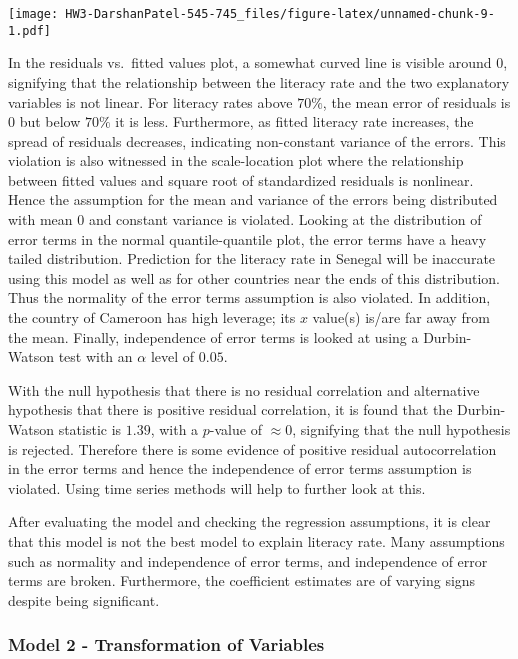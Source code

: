 \documentclass[]{article}
\begin{document}
\texttt{[image: HW3-DarshanPatel-545-745\_files/figure-latex/unnamed-chunk-9-1.pdf]}

In the residuals vs.~fitted values plot, a somewhat curved line is
visible around \(0\), signifying that the relationship between the
literacy rate and the two explanatory variables is not linear. For
literacy rates above \(70\%\), the mean error of residuals is \(0\) but
below \(70\%\) it is less. Furthermore, as fitted literacy rate
increases, the spread of residuals decreases, indicating non-constant
variance of the errors. This violation is also witnessed in the
scale-location plot where the relationship between fitted values and
square root of standardized residuals is nonlinear. Hence the assumption
for the mean and variance of the errors being distributed with mean
\(0\) and constant variance is violated. Looking at the distribution of
error terms in the normal quantile-quantile plot, the error terms have a
heavy tailed distribution. Prediction for the literacy rate in Senegal
will be inaccurate using this model as well as for other countries near
the ends of this distribution. Thus the normality of the error terms
assumption is also violated. In addition, the country of Cameroon has
high leverage; its \(x\) value(s) is/are far away from the mean.
Finally, independence of error terms is looked at using a Durbin-Watson
test with an \(\alpha\) level of \(0.05\).

With the null hypothesis that there is no residual correlation and
alternative hypothesis that there is positive residual correlation, it
is found that the Durbin-Watson statistic is \(1.39\), with a
\(p\)-value of \(\approx 0\), signifying that the null hypothesis is
rejected. Therefore there is some evidence of positive residual
autocorrelation in the error terms and hence the independence of error
terms assumption is violated. Using time series methods will help to
further look at this.

After evaluating the model and checking the regression assumptions, it
is clear that this model is not the best model to explain literacy rate.
Many assumptions such as normality and independence of error terms, and
independence of error terms are broken. Furthermore, the coefficient
estimates are of varying signs despite being significant.

\hypertarget{model-2---transformation-of-variables}{%
\subsubsection{Model 2 - Transformation of
Variables}\label{model-2---transformation-of-variables}}
\end{document}
